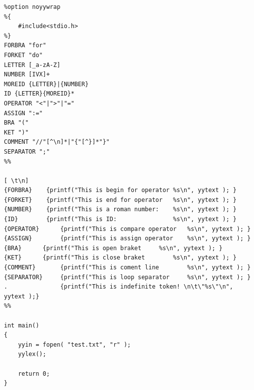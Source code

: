 \documentclass[12pt]{report}
\begin{document}
\begin{verbatim}
%option noyywrap
%{
	#include<stdio.h>
%}
FORBRA "for"
FORKET "do"
LETTER [_a-zA-Z]
NUMBER [IVX]+
MOREID {LETTER}|{NUMBER}
ID {LETTER}{MOREID}*
OPERATOR "<"|">"|"="
ASSIGN ":="
BRA "("
KET ")"
COMMENT "//"[^\n]*|"{"[^}]*"}"
SEPARATOR ";"
%%

[ \t\n]     
{FORBRA}	{printf("This is begin for operator	%s\n", yytext ); }
{FORKET}	{printf("This is end for operator	%s\n", yytext ); }
{NUMBER}	{printf("This is a roman number:	%s\n", yytext ); }
{ID}	    {printf("This is ID:	            %s\n", yytext ); }
{OPERATOR}      {printf("This is compare operator	%s\n", yytext ); }
{ASSIGN}        {printf("This is assign operator	%s\n", yytext ); }
{BRA}	   {printf("This is open braket		%s\n", yytext ); }
{KET}	   {printf("This is close braket		%s\n", yytext ); }
{COMMENT}       {printf("This is coment line		%s\n", yytext ); }
{SEPARATOR}     {printf("This is loop separator		%s\n", yytext ); }
.               {printf("This is indefinite token! \n\t\"%s\"\n", yytext );}
%%

int main()
{
	yyin = fopen( "test.txt", "r" );
	yylex();

	return 0;
}

\end{verbatim}
\end{document}
